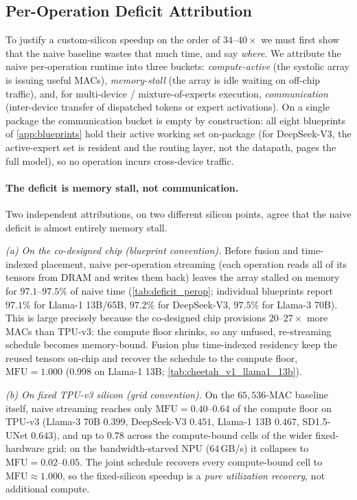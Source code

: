 \subsection{Per-Operation Deficit Attribution}
\label{app:deficit:perop}

To justify a custom-silicon speedup on the order of $34$--$40\times$ we must
first show that the naive baseline wastes that much time, and say \emph{where}.
We attribute the naive per-operation runtime into three buckets:
\emph{compute-active} (the systolic array is issuing useful MACs),
\emph{memory-stall} (the array is idle waiting on off-chip traffic), and, for
multi-device / mixture-of-experts execution, \emph{communication} (inter-device
transfer of dispatched tokens or expert activations). On a single package the
communication bucket is empty by construction: all eight blueprints of
\cref{app:blueprints} hold their active working set on-package (for DeepSeek-V3,
the active-expert set is resident and the routing layer, not the datapath,
pages the full model), so no operation incurs cross-device traffic.

\paragraph{The deficit is memory stall, not communication.}
Two independent attributions, on two different silicon points, agree that the
naive deficit is almost entirely memory stall.

\emph{(a) On the co-designed chip (blueprint convention).} Before fusion and
time-indexed placement, naive per-operation streaming (each operation reads
all of its tensors from DRAM and writes them back) leaves the array stalled
on memory for $\mathbf{97.1}$--$\mathbf{97.5\%}$ of naive time
(\cref{tab:deficit_perop}; individual blueprints report $97.1\%$ for
Llama-1 13B/65B, $97.2\%$ for DeepSeek-V3, $97.5\%$ for Llama-3 70B). This is
large precisely because the co-designed chip provisions $20$--$27\times$ more
MACs than TPU-v3: the compute floor shrinks, so any unfused, re-streaming
schedule becomes memory-bound. Fusion plus time-indexed residency keep the
reused tensors on-chip and recover the schedule to the compute floor,
$\mathrm{MFU}=1.000$ (0.998 on Llama-1 13B; \cref{tab:cheetah_v1_llama1_13b}).

\emph{(b) On fixed TPU-v3 silicon (grid convention).} On the $65{,}536$-MAC
baseline itself, naive streaming reaches only $\mathrm{MFU}=0.40$--$0.64$ of the
compute floor on TPU-v3 (Llama-3 70B $0.399$, DeepSeek-V3 $0.451$,
Llama-1 13B $0.467$, SD1.5-UNet $0.643$), and up to $0.78$ across the
compute-bound cells of the wider fixed-hardware grid; on the bandwidth-starved
NPU ($64$\,GB/s) it collapses to $\mathrm{MFU}=0.02$--$0.05$. The joint schedule
recovers every compute-bound cell to $\mathrm{MFU}\approx1.000$, so the
fixed-silicon speedup is a \emph{pure utilization recovery}, not additional
compute.

